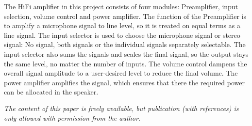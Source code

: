 \begin{multicols}{2}
{\begin{minipage}{2.8in}
The HiFi amplifier in this project consists of four modules: Preamplifier, input selection, volume control and power amplifier. The function of the Preamplifier is to amplify a microphone signal to line level, so it is treated on equal terms as a line signal. 
The input selector is used to choose the microphone signal or stereo signal: No signal, both signals or the individual signals separately selectable. The input selector also sums the signals and scales the final signal, so the output stays the same level, no matter the number of inputs.
The volume control dampens the overall signal amplitude to a user-desired level to reduce the final volume.
The power amplifier amplifies the signal, which ensures that there the required power can be allocated in the speaker.
\end{minipage}}
\newline
\end{multicols}
\textit{\scriptsize{The content of this paper is freely available, but publication (with references) is only allowed with permission from the author.}}